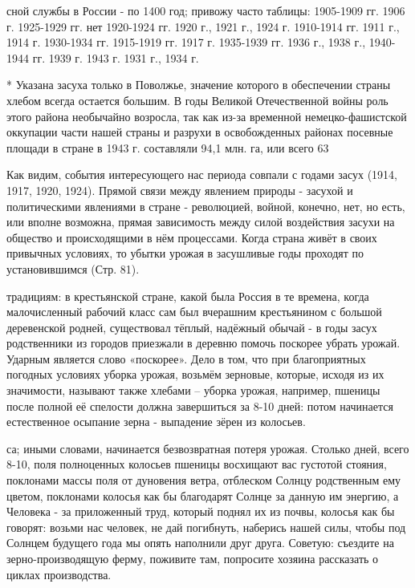 \label{076-1}
сной службы в России - по 1400 год; привожу часто таблицы: 1905-1909 гг. 1906 г. 1925-1929 гг. нет 1920-1924 гг. 1920 г., 1921 г., 1924 г. 1910-1914 гг. 1911 г., 1914 г. 1930-1934 гг. 1915-1919 гг. 1917 г. 1935-1939 гг. 1936 г., 1938 г., 1940-1944 гг. 1939 г. 1943 г. 1931 г., 1934 г.

\label{076-2}
* Указана засуха только в Поволжье, значение которого в обеспечении страны хлебом всегда остается большим. В годы Великой Отечественной войны роль этого района необычайно возросла, так как из-за временной немецко-фашистской оккупации части нашей страны и разрухи в освобожденных районах посевные площади в стране в 1943 г. составляли 94,1 млн. га, или всего 63%

\label{076-3}
Как видим, события интересующего нас периода совпали с годами засух (1914, 1917, 1920, 1924). Прямой связи между явлением природы - засухой и политическими явлениями в стране - революцией, войной, конечно, нет, но есть, или вполне возможна, прямая зависимость между силой воздействия засухи на общество и происходящими в нём процессами. Когда страна живёт в своих привычных условиях, то убытки урожая в засушливые годы проходят по установившимся (Стр. 81).

\label{077-1}
традициям: в крестьянской стране, какой была Россия в те времена, когда малочисленный рабочий класс сам был вчерашним крестьянином с большой деревенской родней, существовал тёплый, надёжный обычай - в годы засух родственники из городов приезжали в деревню помочь поскорее убрать урожай. Ударным является слово «поскорее». Дело в том, что при благоприятных погодных условиях уборка урожая, возьмём зерновые, которые, исходя из их значимости, называют также хлебами – уборка урожая, например, пшеницы после полной её спелости должна завершиться за 8-10 дней: потом начинается естественное осыпание зерна - выпадение зёрен из колосьев.

\label{078-1}
са; иными словами, начинается безвозвратная потеря урожая. Столько дней, всего 8-10, поля полноценных колосьев пшеницы восхищают вас густотой стояния, поклонами массы поля от дуновения ветра, отблеском Солнцу родственным ему цветом, поклонами колосья как бы благодарят Солнце за данную им энергию, а Человека - за приложенный труд, который поднял их из почвы, колосья как бы говорят: возьми нас человек, не дай погибнуть, наберись нашей силы, чтобы под Солнцем будущего года мы опять наполнили друг друга. Советую: съездите на зерно-производящую ферму, поживите там, попросите хозяина рассказать о циклах производства.

